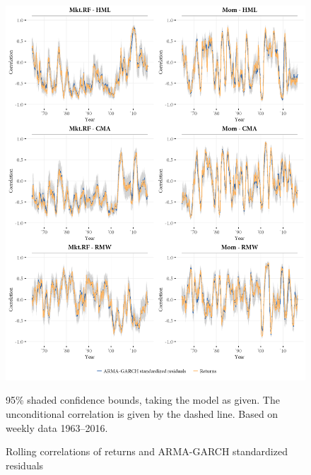\begin{figure}[H]
  \centering
  \footnotesize
  \includegraphics[scale=1]{graphics/appendix_rolling1.png}
  
  \caption{Rolling correlations of returns and ARMA-GARCH standardized residuals}
  \begin{longcaption}
    95\% shaded confidence bounds, taking the model as given. The unconditional correlation is given by the dashed line. Based on weekly data 1963--2016.
  \end{longcaption}
  \label{fig:appendix_rolling1}
\end{figure}
